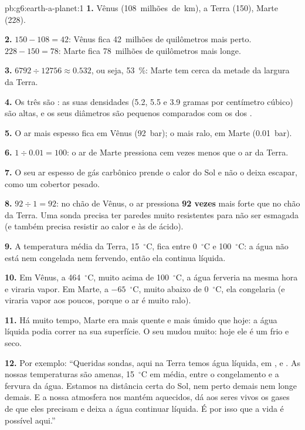 \begin{solution}{pb:g6:earth-a-planet:1}
\textbf{1.} Vênus (108~milhões~de~km), a Terra (150), Marte (228).

\textbf{2.} $150 - 108 = 42$: Vênus fica 42~milhões de quilômetros mais
perto. $228 - 150 = 78$: Marte fica 78~milhões de quilômetros mais longe.

\textbf{3.} $6792 \div 12756 \approx 0.532$, ou seja, 53~\%: Marte tem
cerca da metade da largura da Terra.

\textbf{4.} Os três são : as suas densidades (5.2, 5.5 e
3.9 gramas por centímetro cúbico) são altas, e os seus diâmetros são
pequenos comparados com os dos .

\textbf{5.} O ar mais espesso fica em Vênus (92~bar); o mais ralo, em
Marte (0.01~bar).

\textbf{6.} $1 \div 0.01 = 100$: o ar de Marte pressiona cem vezes menos
que o ar da Terra.

\textbf{7.} O seu ar espesso de gás carbônico prende o calor do Sol e não
o deixa escapar, como um cobertor pesado.

\textbf{8.} $92 \div 1 = 92$: no chão de Vênus, o ar pressiona
\textbf{92 vezes} mais forte que no chão da Terra. Uma sonda precisa ter
paredes muito resistentes para não ser esmagada (e também precisa resistir
ao calor e às  de ácido).

\textbf{9.} A temperatura média da Terra, 15~$^\circ$C, fica entre
0~$^\circ$C e 100~$^\circ$C: a água não está nem congelada nem fervendo,
então ela continua líquida.

\textbf{10.} Em Vênus, a 464~$^\circ$C, muito acima de 100~$^\circ$C, a
água ferveria na mesma hora e viraria vapor. Em Marte, a $-65$~$^\circ$C,
muito abaixo de 0~$^\circ$C, ela congelaria (e viraria vapor aos poucos,
porque o ar é muito ralo).

\textbf{11.} Há muito tempo, Marte era mais quente e mais úmido que hoje:
a água líquida podia correr na sua superfície. O seu  mudou muito:
hoje ele é um  frio e seco.

\textbf{12.} Por exemplo: ``Queridas sondas, aqui na Terra temos água
líquida, em ,  e . As nossas temperaturas são amenas,
15~$^\circ$C em média, entre o congelamento e a fervura da água. Estamos na
distância certa do Sol, nem perto demais nem longe demais. E a nossa
atmosfera nos mantém aquecidos, dá aos seres vivos os gases de que eles
precisam e deixa a água continuar líquida. É por isso que a vida é
possível aqui.''
\end{solution}
